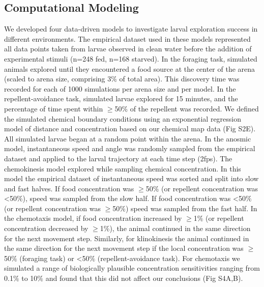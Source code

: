 \subsection*{Computational Modeling}
\noindent We developed four data-driven models to investigate larval exploration success in different environments. The empirical dataset used in these models represented all data points taken from larvae observed in clean water before the addition of experimental stimuli (n=248 fed, n=168 starved). In the foraging task, simulated animals explored until they encountered a food source at the center of the arena (scaled to arena size, comprising 3${\%}$ of total area). This discovery time was recorded for each of 1000 simulations per arena size and per model. In the repellent-avoidance task, simulated larvae explored for 15 minutes, and the percentage of time spent within ${\geq}$50${\%}$ of the repellent was recorded. We defined the simulated chemical boundary conditions using an exponential regression model of distance and concentration based on our chemical map data (Fig S2E). All simulated larvae began at a random point within the arena. In the anosmic model, instantaneous speed and angle was randomly sampled from the empirical dataset and applied to the larval trajectory at each time step (2fps). The chemokinesis model explored while sampling chemical concentration. In this model the empirical dataset of instantaneous speed was sorted and split into slow and fast halves. If food concentration was ${\geq}$50${\%}$ (or repellent concentration was <50${\%}$), speed was sampled from the slow half. If food concentration was <50${\%}$ (or repellent concentration was ${\geq}$50${\%}$) speed was sampled from the fast half. In the chemotaxis model, if food concentration increased by ${\geq}$1${\%}$ (or repellent concentration decreased by ${\geq}$1${\%}$), the animal continued in the same direction for the next movement step. Similarly, for klinokinesis the animal continued in the same direction for the next movement step if the local concentration was ${\geq}$50${\%}$ (foraging task) or <50${\%}$ (repellent-avoidance task). For chemotaxis we simulated a range of biologically plausible concentration sensitivities ranging from 0.1${\%}$ to 10${\%}$ and found that this did not affect our conclusions (Fig S4A,B).